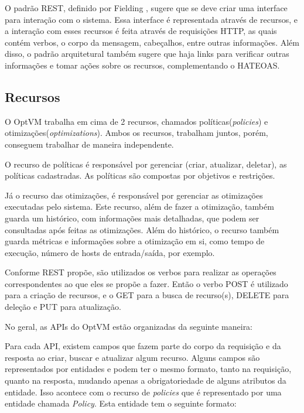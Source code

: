 O padrão REST, definido por Fielding \cite{fielding}, sugere que se deve criar uma interface para interação com o sistema. 
Essa interface é representada através de recursos, e a interação com esses recursos é feita através de requisições HTTP, 
as quais contém verbos, o corpo da mensagem, cabeçalhos, entre outras informações. Além disso, o padrão arquitetural também sugere que 
haja links para verificar outras informações e tomar ações sobre os recursos, complementando o HATEOAS.

\subsection{Recursos}

O OptVM trabalha em cima de 2 recursos, chamados políticas(\textit{policies}) e otimizações(\textit{optimizations}). 
Ambos os recursos, trabalham juntos, porém, conseguem trabalhar de maneira independente.

O recurso de políticas é responsável por gerenciar (criar, atualizar, deletar), as políticas
cadastradas. As políticas são compostas por objetivos e restrições. 

Já o recurso das otimizações, é responsável por gerenciar as otimizações executadas pelo sistema. Este recurso,
além de fazer a otimização, também guarda um histórico, com informações mais detalhadas, 
que podem ser consultadas após feitas as otimizações. Além do histórico, o recurso também guarda métricas e informações sobre
a otimização em si, como tempo de execução, número de hosts de entrada/saída, por exemplo.

Conforme REST propõe, são utilizados os verbos para realizar as operações correspondentes
ao que eles se propõe a fazer. Então o verbo POST é utilizado para a criação de recursos,
e o GET para a busca de recurso(s), DELETE para deleção e PUT para atualização.

No geral, as APIs do OptVM estão organizadas da seguinte maneira:





Para cada API, existem campos que fazem parte do corpo da requisição e da resposta
ao criar, buscar e atualizar algum recurso. Alguns campos são representados por entidades e 
podem ter o mesmo formato, tanto na requisição, quanto na resposta, mudando apenas
a obrigatoriedade de alguns atributos da entidade. Isso acontece
com o recurso de \textit{policies} que é representado por uma entidade chamada \textit{Policy}.
Esta entidade tem o seguinte formato:

